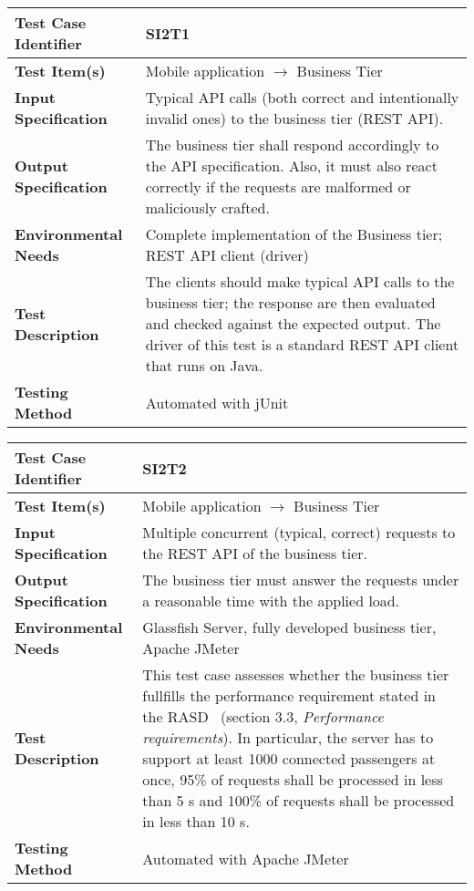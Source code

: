 \begin{tabular}{l p{}}
    \hline
    \textbf{Test Case Identifier} & SI2T1\\
    \hline
    \textbf{Test Item(s)} & Mobile application $\rightarrow$ Business Tier\\
    \hline
    \textbf{Input Specification} & Typical API calls (both correct and intentionally invalid ones) to the business tier (REST API).\\
    \hline
    \textbf{Output Specification} & The business tier shall respond accordingly to the API specification. Also, it must also react correctly if the requests are malformed or maliciously crafted.\\
    \hline
    \textbf{Environmental Needs} & Complete implementation of the Business tier; REST API client (driver)\\
    \hline
    \textbf{Test Description} & The clients should make typical API calls to the business tier; the response are then evaluated and checked against the expected output. The driver of this test is a standard REST API client that runs on Java.\\
    \hline
    \textbf{Testing Method} & Automated with jUnit \\
    \hline
\end{tabular}

\vspace{2em}

\noindent\begin{tabular}{l p{}}
    \hline
    \textbf{Test Case Identifier} & SI2T2\\
    \hline
    \textbf{Test Item(s)} & Mobile application $\rightarrow$ Business Tier\\
    \hline
    \textbf{Input Specification} & Multiple concurrent (typical, correct) requests to the REST API of the business tier.\\
    \hline
    \textbf{Output Specification} & The business tier must answer the requests under a reasonable time with the applied load. \\
    \hline
    \textbf{Environmental Needs} & Glassfish Server, fully developed business tier, Apache JMeter\\
    \hline
    \textbf{Test Description} & This test case assesses whether the business tier fullfills the performance requirement stated in the RASD~\cite{mytaxi-rasd} (section 3.3, \emph{Performance requirements}). In particular, the server has to support at least 1000 connected passengers at once, 95\% of requests shall be processed in less than 5 s and 100\% of requests shall be processed in less than 10 s.\\
    \hline
    \textbf{Testing Method} & Automated with Apache JMeter \\
    \hline
\end{tabular}

